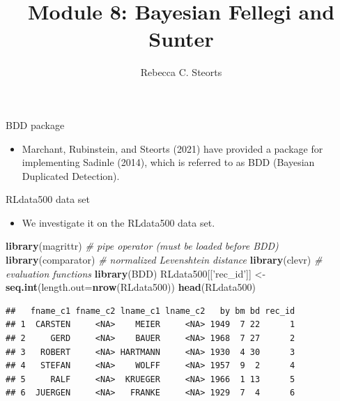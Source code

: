 \documentclass[
  ignorenonframetext,
]{beamer}
\title{Module 8: Bayesian Fellegi and Sunter}
\author{Rebecca C. Steorts}
\date{}
\newenvironment{Shaded}{\begin{snugshade}}{\end{snugshade}}
\newcommand{\CommentTok}[1]{\textcolor[rgb]{0.56,0.35,0.01}{\textit{#1}}}
\newcommand{\DataTypeTok}[1]{\textcolor[rgb]{0.13,0.29,0.53}{#1}}
\newcommand{\KeywordTok}[1]{\textcolor[rgb]{0.13,0.29,0.53}{\textbf{#1}}}
\newcommand{\NormalTok}[1]{#1}
\newcommand{\StringTok}[1]{\textcolor[rgb]{0.31,0.60,0.02}{#1}}
\providecommand{\tightlist}{%
  \setlength{\itemsep}{0pt}\setlength{\parskip}{0pt}}
\begin{document}
\frame{\titlepage}

\begin{frame}{BDD package}
\protect\hypertarget{bdd-package}{}

\begin{itemize}
\tightlist
\item
  Marchant, Rubinstein, and Steorts (2021) have provided a package for
  implementing Sadinle (2014), which is referred to as BDD (Bayesian
  Duplicated Detection).
\end{itemize}

\end{frame}

\begin{frame}[fragile]{RLdata500 data set}
\protect\hypertarget{rldata500-data-set}{}

\begin{itemize}
\tightlist
\item
  We investigate it on the RLdata500 data set.
\end{itemize}

\footnotesize

\begin{Shaded}
\begin{Highlighting}[]
\KeywordTok{library}\NormalTok{(magrittr)    }\CommentTok{# pipe operator (must be loaded before BDD)}
\KeywordTok{library}\NormalTok{(comparator)  }\CommentTok{# normalized Levenshtein distance}
\KeywordTok{library}\NormalTok{(clevr)       }\CommentTok{# evaluation functions}
\KeywordTok{library}\NormalTok{(BDD)}
\NormalTok{RLdata500[[}\StringTok{'rec_id'}\NormalTok{]] <-}\StringTok{ }\KeywordTok{seq.int}\NormalTok{(}\DataTypeTok{length.out=}\KeywordTok{nrow}\NormalTok{(RLdata500))}
\KeywordTok{head}\NormalTok{(RLdata500)}
\end{Highlighting}
\end{Shaded}

\begin{verbatim}
##   fname_c1 fname_c2 lname_c1 lname_c2   by bm bd rec_id
## 1  CARSTEN     <NA>    MEIER     <NA> 1949  7 22      1
## 2     GERD     <NA>    BAUER     <NA> 1968  7 27      2
## 3   ROBERT     <NA> HARTMANN     <NA> 1930  4 30      3
## 4   STEFAN     <NA>    WOLFF     <NA> 1957  9  2      4
## 5     RALF     <NA>  KRUEGER     <NA> 1966  1 13      5
## 6  JUERGEN     <NA>   FRANKE     <NA> 1929  7  4      6
\end{verbatim}

\end{frame}
\end{document}
